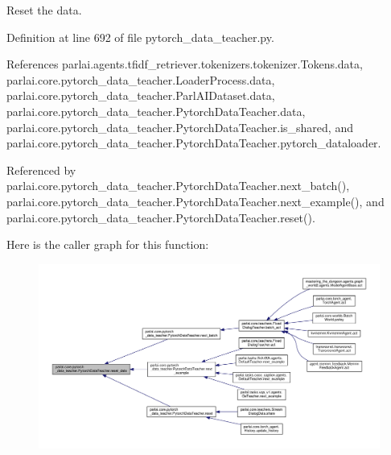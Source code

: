 \begin{DoxyVerb}Reset the data.\end{DoxyVerb}
 

Definition at line 692 of file pytorch\+\_\+data\+\_\+teacher.\+py.



References parlai.\+agents.\+tfidf\+\_\+retriever.\+tokenizers.\+tokenizer.\+Tokens.\+data, parlai.\+core.\+pytorch\+\_\+data\+\_\+teacher.\+Loader\+Process.\+data, parlai.\+core.\+pytorch\+\_\+data\+\_\+teacher.\+Parl\+A\+I\+Dataset.\+data, parlai.\+core.\+pytorch\+\_\+data\+\_\+teacher.\+Pytorch\+Data\+Teacher.\+data, parlai.\+core.\+pytorch\+\_\+data\+\_\+teacher.\+Pytorch\+Data\+Teacher.\+is\+\_\+shared, and parlai.\+core.\+pytorch\+\_\+data\+\_\+teacher.\+Pytorch\+Data\+Teacher.\+pytorch\+\_\+dataloader.



Referenced by parlai.\+core.\+pytorch\+\_\+data\+\_\+teacher.\+Pytorch\+Data\+Teacher.\+next\+\_\+batch(), parlai.\+core.\+pytorch\+\_\+data\+\_\+teacher.\+Pytorch\+Data\+Teacher.\+next\+\_\+example(), and parlai.\+core.\+pytorch\+\_\+data\+\_\+teacher.\+Pytorch\+Data\+Teacher.\+reset().

Here is the caller graph for this function\+:
\nopagebreak
\begin{figure}[H]
\begin{center}
\leavevmode
\includegraphics[width=350pt]{classparlai_1_1core_1_1pytorch__data__teacher_1_1PytorchDataTeacher_aaf9f8b1b0b358832d16f917c598151fa_icgraph}
\end{center}
\end{figure}
\mbox{\label{classparlai_1_1core_1_1pytorch__data__teacher_1_1PytorchDataTeacher_a519a6be3f88b650d0325402b0c4b80ce}} 
